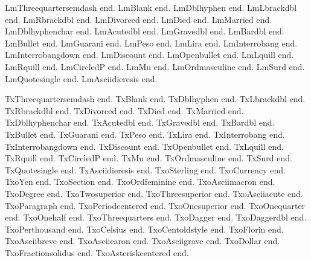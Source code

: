 \documentclass{article}
\begin{document}
LmThreequartersemdash \textthreequartersemdash{} end.
LmBlank \textblank{} end.
LmDblhyphen \textdblhyphen{} end.
LmLbrackdbl \textlbrackdbl{} end.
LmRbrackdbl \textrbrackdbl{} end.
LmDivorced \textdivorced{} end.
LmDied \textdied{} end.
LmMarried \textmarried{} end.
LmDblhyphenchar \textdblhyphenchar{} end.
LmAcutedbl \textacutedbl{} end.
LmGravedbl \textgravedbl{} end.
LmBardbl \textbardbl{} end.
LmBullet \textbullet{} end.
LmGuarani \textguarani{} end.
LmPeso \textpeso{} end.
LmLira \textlira{} end.
LmInterrobang \textinterrobang{} end.
LmInterrobangdown \textinterrobangdown{} end.
LmDiscount \textdiscount{} end.
LmOpenbullet \textopenbullet{} end.
LmLquill \textlquill{} end.
LmRquill \textrquill{} end.
LmCircledP \textcircledP{} end.
LmMu \textmu{} end.
LmOrdmasculine \textordmasculine{} end.
LmSurd \textsurd{} end.
LmQuotesingle \textquotesingle{} end.
LmAsciidieresis \textasciidieresis{} end.

{\selectfont
TxThreequartersemdash \textthreequartersemdash{} end.
TxBlank \textblank{} end.
TxDblhyphen \textdblhyphen{} end.
TxLbrackdbl \textlbrackdbl{} end.
TxRbrackdbl \textrbrackdbl{} end.
TxDivorced \textdivorced{} end.
TxDied \textdied{} end.
TxMarried \textmarried{} end.
TxDblhyphenchar \textdblhyphenchar{} end.
TxAcutedbl \textacutedbl{} end.
TxGravedbl \textgravedbl{} end.
TxBardbl \textbardbl{} end.
TxBullet \textbullet{} end.
TxGuarani \textguarani{} end.
TxPeso \textpeso{} end.
TxLira \textlira{} end.
TxInterrobang \textinterrobang{} end.
TxInterrobangdown \textinterrobangdown{} end.
TxDiscount \textdiscount{} end.
TxOpenbullet \textopenbullet{} end.
TxLquill \textlquill{} end.
TxRquill \textrquill{} end.
TxCircledP \textcircledP{} end.
TxMu \textmu{} end.
TxOrdmasculine \textordmasculine{} end.
TxSurd \textsurd{} end.
TxQuotesingle \textquotesingle{} end.
TxAsciidieresis \textasciidieresis{} end.
TxoSterling \textsterling{} end.
TxoCurrency \textcurrency{} end.
TxoYen \textyen{} end.
TxoSection \textsection{} end.
TxoOrdfeminine \textordfeminine{} end.
TxoAsciimacron \textasciimacron{} end.
TxoDegree \textdegree{} end.
TxoTwosuperior \texttwosuperior{} end.
TxoThreesuperior \textthreesuperior{} end.
TxoAsciiacute \textasciiacute{} end.
TxoParagraph \textparagraph{} end.
TxoPeriodcentered \textperiodcentered{} end.
TxoOnesuperior \textonesuperior{} end.
TxoOnequarter \textonequarter{} end.
TxoOnehalf \textonehalf{} end.
TxoThreequarters \textthreequarters{} end.
TxoDagger \textdagger{} end.
TxoDaggerdbl \textdaggerdbl{} end.
TxoPerthousand \textperthousand{} end.
TxoCelsius \textcelsius{} end.
TxoCentoldstyle \textcentoldstyle{} end.
TxoFlorin \textflorin{} end.
TxoAsciibreve \textasciibreve{} end.
TxoAsciicaron \textasciicaron{} end.
TxoAsciigrave \textasciigrave{} end.
TxoDollar \textdollar{} end.
TxoFractionsolidus \textfractionsolidus{} end.
TxoAsteriskcentered \textasteriskcentered{} end.}
\end{document}
